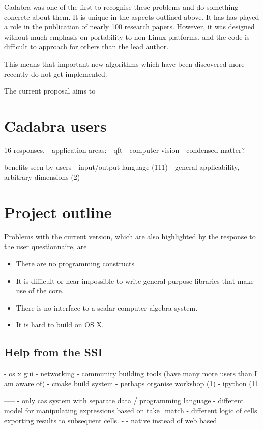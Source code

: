 \documentclass[11pt]{article}
\begin{document}
Cadabra was one of the first to recognise these problems and do
something concrete about them. It is unique in the aspects outlined
above. It has has played a role in the publication of nearly 100
research papers. However, it was designed without much emphasis on
portability to non-Linux platforms, and the code is difficult to
approach for others than the lead author.

This means that important new algorithms which have been discovered
more recently do not get implemented. 

The current proposal aims to 

\section{Cadabra users}

16 responses.
- application areas:
    - qft
    - computer vision
    - condensed matter?

benefits seen by users
  - input/output language (111)
  - general applicability, arbitrary dimensions (2)

\section{Project outline}

Problems with the current version, which are also highlighted by the
response to the user questionnaire, are
\begin{itemize}
\item There are no programming constructs 
\item It is difficult or near impossible to write general purpose
  libraries that make use of the core.
\item There is no interface to a scalar computer algebra system.
\item It is hard to build on OS X.
\end{itemize}


\subsection{Help from the SSI}

  - os x gui
  - networking
  - community building tools (have many more users than I am aware of)
  - cmake build system 
  - perhaps organise workshop (1)
  - ipython (11

   
-----
- only cas system with separate data / programming language
- different model for manipulating expressions based on take\_match
- different logic of cells exporting results to subsequent cells.
- 
- native instead of web based
\end{document}
